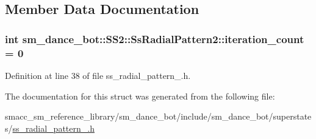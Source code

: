 \subsection{Member Data Documentation}
\subsubsection[{\texorpdfstring{iteration\+\_\+count}{iteration_count}}]{\setlength{\rightskip}{0pt plus 5cm}int sm\+\_\+dance\+\_\+bot\+::\+S\+S2\+::\+Ss\+Radial\+Pattern2\+::iteration\+\_\+count = 0}\hypertarget{structsm__dance__bot_1_1SS2_1_1SsRadialPattern2_afae1dd33bea98f712ba2938a35c0ddc1}{}\label{structsm__dance__bot_1_1SS2_1_1SsRadialPattern2_afae1dd33bea98f712ba2938a35c0ddc1}


Definition at line 38 of file ss\+\_\+radial\+\_\+pattern\+\_.\+h.



The documentation for this struct was generated from the following file\+:\begin{DoxyCompactItemize}
\item 
smacc\+\_\+sm\+\_\+reference\+\_\+library/sm\+\_\+dance\+\_\+bot/include/sm\+\_\+dance\+\_\+bot/superstates/\hyperlink{ss__radial__pattern__2_8h}{ss\+\_\+radial\+\_\+pattern\+\_.\+h}\end{DoxyCompactItemize}
